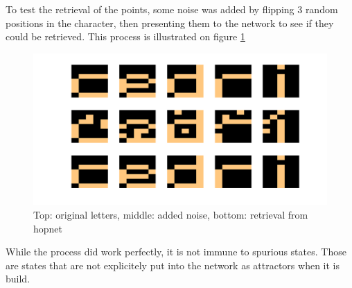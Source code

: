 \documentclass[11pt, a4paper]{article}
\begin{document}
To test the retrieval of the points, some noise was added by flipping 3 random positions in the character, then presenting them to the network to see if they could be retrieved. This process is illustrated on figure \ref{fig:hopfield_chargen}

\begin{figure}[H]
  \centering
  \includegraphics[scale=.30]{hopfield_denoising.png}
  \caption{Top: original letters, middle: added noise, bottom:
    retrieval from hopnet}
  \label{fig:hopfield_chargen}
\end{figure}

While the process did work perfectly, it is not immune to spurious
states. Those are states that are not explicitely put into the network
as attractors when it is build.

\end{document}
